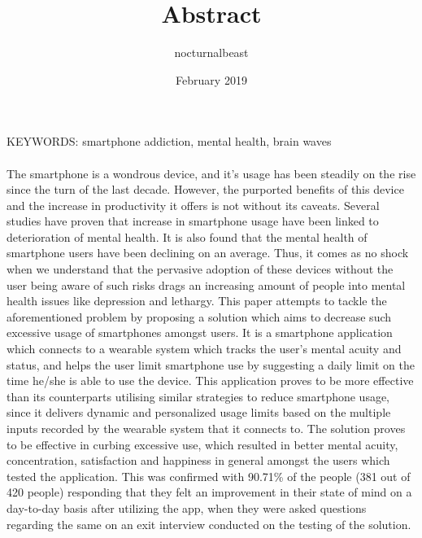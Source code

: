 \documentclass{article}
\title{Abstract}
\author{nocturnalbeast}
\date{February 2019}
\begin{document}
\maketitle

KEYWORDS: smartphone addiction, mental health, brain waves

\paragraph{} The smartphone is a wondrous device, and it's usage has been steadily on the rise since the turn of the last decade. However, the purported benefits of this device and the increase in productivity it offers is not without its caveats. Several studies have proven that increase in smartphone usage have been linked to deterioration of mental health\cite{bian2015linking,twenge2017have,ward2017brain}. It is also found that the mental health of smartphone users have been declining on an average. Thus, it comes as no shock when we understand that the pervasive adoption of these devices without the user being aware of such risks drags an increasing amount of people into mental health issues like depression and lethargy. This paper attempts to tackle the aforementioned problem by proposing a solution which aims to decrease such excessive usage of smartphones amongst users. It is a smartphone application which connects to a wearable system which tracks the user's mental acuity and status, and helps the user limit smartphone use by suggesting a daily limit on the time he/she is able to use the device. This application proves to be more effective than its counterparts utilising similar strategies to reduce smartphone usage, since it delivers dynamic and personalized usage limits based on the multiple inputs recorded by the wearable system that it connects to. The solution proves to be effective in curbing excessive use, which resulted in better mental acuity, concentration, satisfaction and happiness in general amongst the users which tested the application. This was confirmed with 90.71\% of the people (381 out of 420 people) responding that they felt an improvement in their state of mind on a day-to-day basis after utilizing the app, when they were asked questions regarding the same on an exit interview conducted on the testing of the solution.

\newpage
\printbibliography
\end{document}
